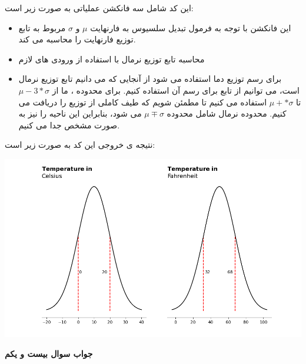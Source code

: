 \documentclass[a4paper,14pt]{article}
\begin{document}
این کد شامل سه فانکشن عملیاتی به صورت زیر است:
\begin{itemize}
	\item {}
	\subitem 	این فانکشن با توجه به فرمول تبدیل سلسیوس به فارنهایت $\mu$  و $\sigma$ مربوط به تابع توزیع فارنهایت را محاسبه می کند.
	\item {}
	\subitem	محاسبه تابع توزیع نرمال با استفاده از ورودی های لازم
	\subitem {}
	\item {}
	\subitem	برای رسم توزیع  دما استفاده می شود
	\subitem	از آنجایی که می دانیم تابع توزیع نرمال است، می توانیم از تابع  برای رسم آن استفاده کنیم. برای محدوده ، ما از $\mu - 3 * \sigma$ تا $\mu + * \sigma$ استفاده می کنیم تا مطمئن شویم که طیف کاملی از توزیع را دریافت می کنیم.
	\subitem	محدوده نرمال شامل محدوده $\mu \mp \sigma$ می شود، بنابراین این ناحیه را نیز به صورت مشخص جدا می کنیم.
\end{itemize}
	
	نتیجه ی خروجی این کد به صورت زیر است:\\
	
	\begin{center}
		\includegraphics[width=1\textwidth]{pic5.png}
	\end{center}
	
	\textbf{جواب سوال بیست و یکم}\\
	
		\fontsize{11}{11}\selectfont
	
\end{document}
